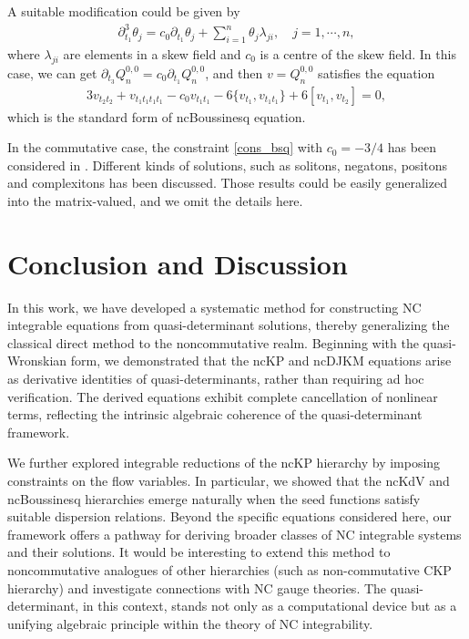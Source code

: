 \documentclass[11p,reqno]{amsart}
\numberwithin{equation}{section}
\numberwithin{equation}{section}
\begin{document}
A suitable modification could be given by 
\begin{align}\label{cons_bsq}
\partial_{t_1}^3\theta_j=c_0\partial_{t_1} \theta_j+\sum_{i=1}^n \theta_j\lambda_{ji},\quad j=1,\cdots,n,
\end{align}
where $\lambda_{ji}$ are elements in a skew field and $c_0$ is a centre of the skew field.
In this case, we can get $\partial_{t_3}Q_n^{0,0}=c_0\partial_{t_1} Q_n^{0,0}$, and then $v=Q_n^{0,0}$ satisfies the equation
\begin{align*}
3v_{t_2t_2}+v_{t_1t_1t_1t_1}-c_0v_{t_1t_1}-6\{v_{t_1},v_{t_1t_1}\}+6[v_{t_1},v_{t_2}]=0,
\end{align*}
which is the standard form of ncBoussinesq equation.

In the commutative case, the constraint \eqref{cons_bsq} with $c_0=-3/4$ has been considered in \cite{li07}. Different kinds of solutions, such as solitons, negatons, positons and complexitons has been discussed. Those results could be easily generalized into the matrix-valued, and we omit the details here. 



\section{Conclusion and Discussion}

In this work, we have developed a systematic method for constructing NC integrable equations from quasi-determinant solutions, thereby generalizing the classical direct method to the noncommutative realm. Beginning with the quasi-Wronskian form, we demonstrated that the ncKP and ncDJKM equations arise as derivative identities of quasi-determinants, rather than requiring ad hoc verification. The derived equations exhibit complete cancellation of nonlinear terms, reflecting the intrinsic algebraic coherence of the quasi-determinant framework.

We further explored integrable reductions of the ncKP hierarchy by imposing constraints on the flow variables. In particular, we showed that the ncKdV and ncBoussinesq hierarchies emerge naturally when the seed functions satisfy suitable dispersion relations. Beyond the specific equations considered here, our framework offers a pathway for deriving broader classes of NC integrable systems and their solutions. It would be interesting to extend this method to noncommutative analogues of other hierarchies (such as non-commutative CKP hierarchy) and investigate connections with NC gauge theories. The quasi-determinant, in this context, stands not only as a computational device but as a unifying algebraic principle within the theory of NC integrability.
\end{document}
